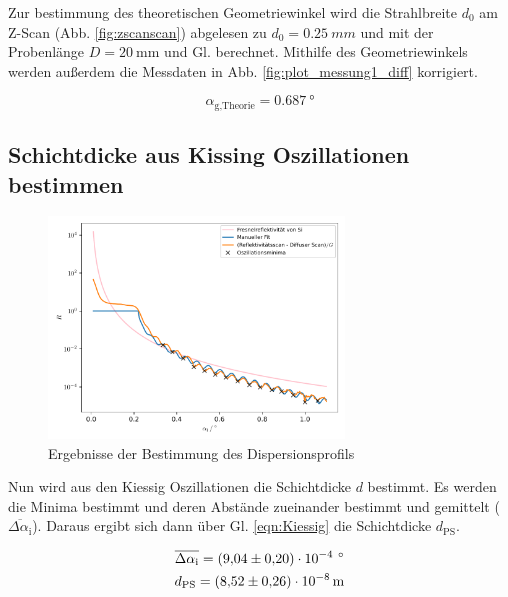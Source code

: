 Zur bestimmung des theoretischen Geometriewinkel wird die Strahlbreite $d_0$ am Z-Scan
(Abb. \ref{fig:zscanscan}) abgelesen zu $d_0=\SI{0.25}{mm}$ und mit der Probenlänge $D = \SI{20}{\milli\meter}$
und Gl.  berechnet. Mithilfe des Geometriewinkels werden außerdem die Messdaten 
in Abb. \ref{fig:plot_messung1_diff} korrigiert.


\begin{equation*}
  \alpha_\text{g,Theorie} = \SI{0.687}{\degree}
\end{equation*}


\subsection{Schichtdicke aus Kissing Oszillationen bestimmen}

\begin{figure}
  \centering
  \includegraphics[width=0.7\textwidth]{figures/plot_messung2_parrat.pdf}
  \caption{Ergebnisse der Bestimmung des
  Dispersionsprofils}
  \label{fig:plot_messung2_parrat}
\end{figure}

Nun wird aus den Kiessig Oszillationen die Schichtdicke $d$ bestimmt. 
Es werden die Minima bestimmt und deren Abstände zueinander bestimmt und 
gemittelt ($\overline{\Delta\alpha_\text{i}}$).
Daraus ergibt sich dann über Gl. \eqref{eqn:Kiessig} die Schichtdicke $d_\text{PS}$.

\begin{align*}
  \overline{\Delta\alpha_\text{i}} = \SI{9.04+-0.20e-4}{\,\degree} \\
  d_\text{PS} = \SI{8.52+-0.26e-08}{\meter}
\end{align*}

